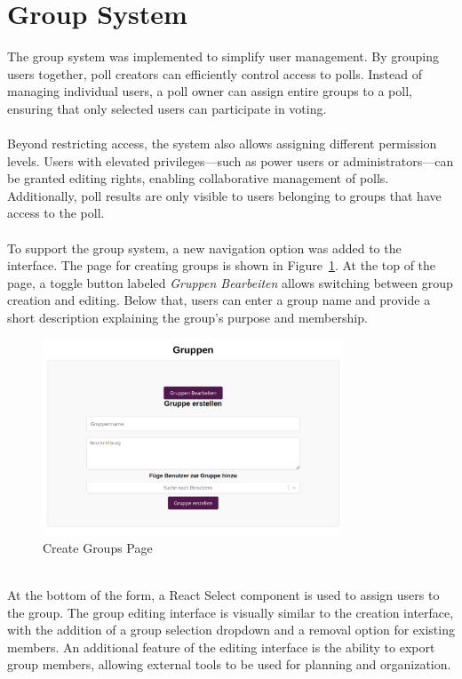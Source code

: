 \documentclass[a4paper,12pt]{report}
\begin{document}
\section{Group System}
The group system was implemented to simplify user management. By grouping users together, poll creators can efficiently control access to polls. Instead of managing individual users, a poll owner can assign entire groups to a poll, ensuring that only selected users can participate in voting. \\\\
Beyond restricting access, the system also allows assigning different permission levels. Users with elevated privileges—such as power users or administrators—can be granted editing rights, enabling collaborative management of polls. Additionally, poll results are only visible to users belonging to groups that have access to the poll. \\\\
To support the group system, a new navigation option was added to the interface. The page for creating groups is shown in Figure~\ref{fig:create_groups}. At the top of the page, a toggle button labeled \textit{Gruppen Bearbeiten} allows switching between group creation and editing. Below that, users can enter a group name and provide a short description explaining the group's purpose and membership.
\begin{figure}[H]
	\centering
	\includegraphics[width=0.8\textwidth]{pics/create_groups.png}
	\caption{Create Groups Page}
	\label{fig:create_groups}
\end{figure}
\noindent \\
At the bottom of the form, a React Select component is used to assign users to the group. The group editing interface is visually similar to the creation interface, with the addition of a group selection dropdown and a removal option for existing members. An additional feature of the editing interface is the ability to export group members, allowing external tools to be used for planning and organization.
\end{document}
